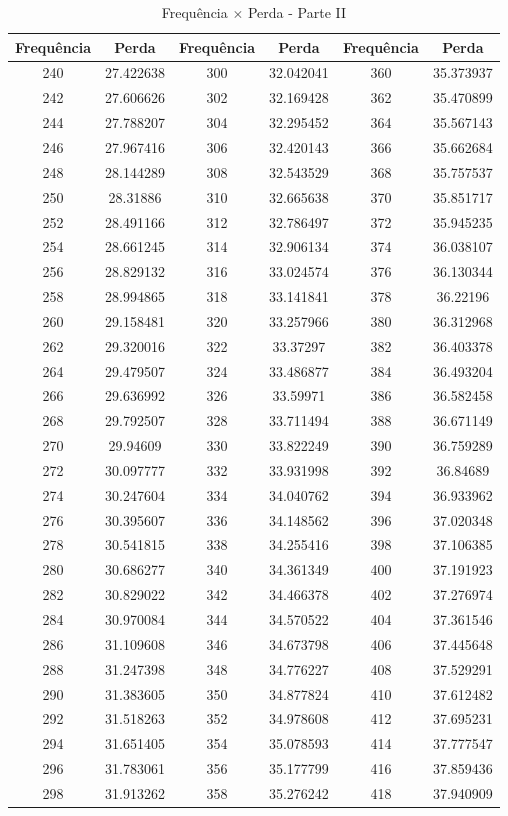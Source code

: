 \documentclass[
	12pt,				%
	openright,			%
	twoside,			%
	a4paper,			%
	english,			%
	french,				%
	spanish,			%
	brazil,				%
	]{abntex2}
\begin{document}
\begin{apendicesenv}
\newpage
\begin{table}[H]
\caption{Frequência  $\times$ Perda - Parte II \label{tab:p_f_ii}}
\centering
\begin{tabular}{c c| c c | c c}
Frequência & Perda & Frequência & Perda & Frequência & Perda \\
\hline
240 & 27.422638 & 300 & 32.042041 & 360 & 35.373937\\
242 & 27.606626 & 302 & 32.169428 & 362 & 35.470899\\
244 & 27.788207 & 304 & 32.295452 & 364 & 35.567143\\
246 & 27.967416 & 306 & 32.420143 & 366 & 35.662684\\
248 & 28.144289 & 308 & 32.543529 & 368 & 35.757537\\
250 & 28.31886 & 310 & 32.665638 & 370 & 35.851717\\
252 & 28.491166 & 312 & 32.786497 & 372 & 35.945235\\
254 & 28.661245 & 314 & 32.906134 & 374 & 36.038107\\
256 & 28.829132 & 316 & 33.024574 & 376 & 36.130344\\
258 & 28.994865 & 318 & 33.141841 & 378 & 36.22196\\
260 & 29.158481 & 320 & 33.257966 & 380 & 36.312968\\
262 & 29.320016 & 322 & 33.37297 & 382 & 36.403378\\
264 & 29.479507 & 324 & 33.486877 & 384 & 36.493204\\
266 & 29.636992 & 326 & 33.59971 & 386 & 36.582458\\
268 & 29.792507 & 328 & 33.711494 & 388 & 36.671149\\
270 & 29.94609 & 330 & 33.822249 & 390 & 36.759289\\
272 & 30.097777 & 332 & 33.931998 & 392 & 36.84689\\
274 & 30.247604 & 334 & 34.040762 & 394 & 36.933962\\
276 & 30.395607 & 336 & 34.148562 & 396 & 37.020348\\
278 & 30.541815 & 338 & 34.255416 & 398 & 37.106385\\
280 & 30.686277 & 340 & 34.361349 & 400 & 37.191923\\
282 & 30.829022 & 342 & 34.466378 & 402 & 37.276974\\
284 & 30.970084 & 344 & 34.570522 & 404 & 37.361546\\
286 & 31.109608 & 346 & 34.673798 & 406 & 37.445648\\
288 & 31.247398 & 348 & 34.776227 & 408 & 37.529291\\
290 & 31.383605 & 350 & 34.877824 & 410 & 37.612482\\
292 & 31.518263 & 352 & 34.978608 & 412 & 37.695231\\
294 & 31.651405 & 354 & 35.078593 & 414 & 37.777547\\
296 & 31.783061 & 356 & 35.177799 & 416 & 37.859436\\
298 & 31.913262 & 358 & 35.276242 & 418 & 37.940909
\end{tabular}
\end{table}


\end{apendicesenv}
\end{document}

